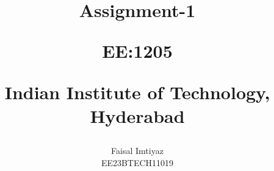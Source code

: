 \documentclass[journal,12pt,twocolumn]{IEEEtran}
\theoremstyle{remark}
\begin{document}
%




\vspace{3cm}

\title{
Assignment-1 

\large{EE:1205 }

Indian Institute of Technology, Hyderabad
}
\author{Faisal Imtiyaz

EE23BTECH11019
}  


%
%
%
% 
%



% 
\end{document}
